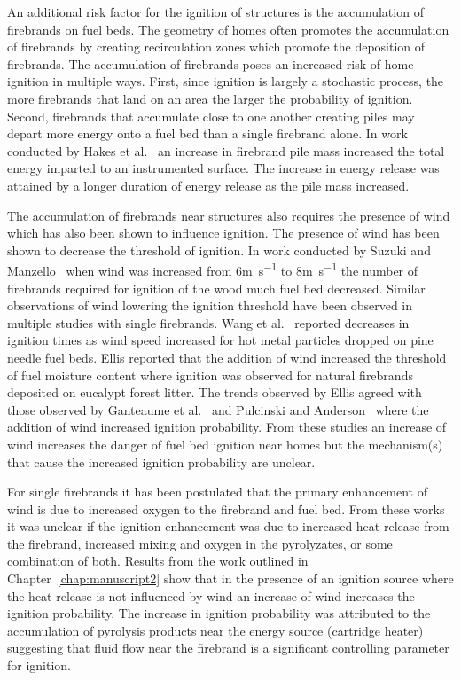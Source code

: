     An additional risk factor for the ignition of structures is the accumulation of firebrands on fuel beds. The geometry of homes often promotes the accumulation of firebrands by creating recirculation zones which promote the deposition of firebrands. The accumulation of firebrands poses an increased risk of home ignition in multiple ways. First, since ignition is largely a stochastic process, the more firebrands that land on an area the larger the probability of ignition. Second, firebrands that accumulate close to one another creating piles may depart more energy onto a fuel bed than a single firebrand alone. In work conducted by Hakes et al.~\cite{Hakes2019a} an increase in firebrand pile mass increased the total energy imparted to an instrumented surface. The increase in energy release was attained by a longer duration of energy release as the pile mass increased.
    
    The accumulation of firebrands near structures also requires the presence of wind which has also been shown to influence ignition. The presence of wind has been shown to decrease the threshold of ignition. In work conducted by Suzuki and Manzello~\cite{Suzuki2020a} when wind was increased from 6\si{\meter\per\second} to 8\si{\meter\per\second} the number of firebrands required for ignition of the wood much fuel bed decreased. Similar observations of wind lowering the ignition threshold have been observed in multiple studies with single firebrands. Wang et al.~\cite{Wang2017} reported decreases in ignition times as wind speed increased for hot metal particles dropped on pine needle fuel beds. Ellis reported that the addition of wind increased the threshold of fuel moisture content where ignition was observed for natural firebrands  deposited on eucalypt forest litter. The trends observed by Ellis agreed with those observed by Ganteaume et al.~\cite{Ganteaume2009} and Pulcinski and Anderson~\cite{Plucinski2008} where the addition of wind increased ignition probability. From these studies an increase of wind increases the danger of fuel bed ignition near homes but the mechanism(s) that cause the increased ignition probability are unclear. 
    
    For single firebrands it has been postulated that the primary enhancement of wind is due to increased oxygen to the firebrand and fuel bed. From these works it was unclear if the ignition enhancement was due to increased heat release from the firebrand, increased mixing and oxygen in the pyrolyzates, or some combination of both. Results from the work outlined in Chapter~\ref{chap:manuscript2} show that in the presence of an ignition source where the heat release is not influenced by wind an increase of wind increases the ignition probability. The increase in ignition probability was attributed to the accumulation of pyrolysis products near the energy source (cartridge heater) suggesting that fluid flow near the firebrand is a significant controlling parameter for ignition. 
    
